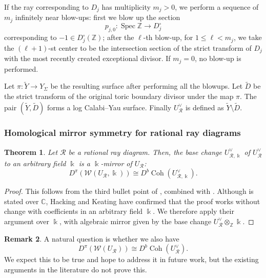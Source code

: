 \documentclass[11pt, reqno]{amsart}
\newtheorem{theorem}{Theorem}[section]
\theoremstyle{definition}
\newtheorem{remark}[theorem]{Remark}
\begin{document}
    If the ray corresponding to $D_j$ has multiplicity $m_j>0$, we perform a sequence of $m_j$ infinitely near blow-ups: first we blow up the section
\[
p_{j,0}\colon \operatorname{Spec}\mathbb Z\longrightarrow D_j^\circ
\]
corresponding to $-1\in D_j^\circ(\mathbb Z)$; after the $\ell$-th blow-up, for $1\leq\ell<m_j$, we take the $(\ell+1)$-st center to be the intersection section of the strict transform of $D_j$ with the most recently created exceptional divisor. If $m_j=0$, no blow-up is performed.

 Let $\pi: \widetilde{Y} \longrightarrow Y_{\Sigma}$
be the resulting surface after performing all the blowups.
 Let $\widetilde{D}$ be the  strict transform of the original toric boundary divisor under the map $\pi$. The pair $(\widetilde{Y}, \widetilde{D})$ forms a log Calabi--Yau surface. Finally $U^\vee_\mathcal{R}$ is defined as $\widetilde{Y} \setminus \widetilde{D}$.



\subsubsection{Homological mirror symmetry for rational ray diagrams}


\begin{theorem}\label{thm-hk}
Let $\mathcal{R}$ be a rational ray diagram. Then, the base change $U^\vee_{\mathcal{R}, \Bbbk}$ of $U^\vee_\mathcal{R}$ to an arbitrary field $\Bbbk$ is a $\Bbbk$-mirror of $U_\mathcal{R}$:
\[ D^\pi(\mathcal{W}(U_\mathcal{R},\Bbbk)) \cong D^b \operatorname{Coh}(U^\vee_{\mathcal{R}, \Bbbk}). \]

\end{theorem}


\begin{proof}
This follows from the third bullet point of
\cite[Theorem~1.1]{HK22}, combined with
\cite[Theorem~1.2]{HK22}. Although
\cite[Theorem~1.1]{HK22} is stated over $\mathbb{C}$,
Hacking and Keating have confirmed that the proof works without
change with coefficients in an arbitrary field $\Bbbk$. We therefore
apply their argument over $\Bbbk$, with algebraic mirror given by the
base change $U_{\mathcal R}^{\vee}\otimes_{\mathbb Z}\Bbbk$.
\end{proof}
  
\begin{remark}
    A natural question is whether we also have \[ D^\pi(\mathcal{W}(U_\mathcal{R})) \cong D^b \operatorname{Coh}(U^\vee_{\mathcal{R}}). \] We expect this to be true and hope to address it in future work, but the existing arguments in the literature do not prove this.
\end{remark}
\end{document}
